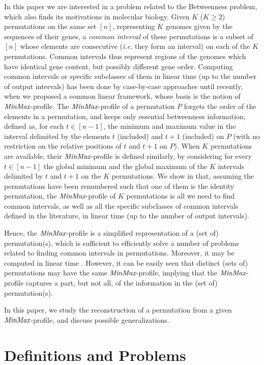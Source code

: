 \documentclass{article}
\newcommand{\M}{\mbox{\it MinMax}}
\newcommand{\n}{[n]}
\begin{document}
In this paper we are interested in a problem related to the {\sc Betweenness} problem,  which also
finds its motivations in molecular biology. Given $K$ ($K\geq 2$) permutations on the
same set $\n$, representing $K$ genomes given by the sequences of their genes, a {\em common interval} 
of these permutations is a subset of $\n$ whose elements are consecutive ({\em i.e.} they form an interval) 
on each of the $K$ permutations. Common intervals thus represent regions of the genomes which have identical 
gene content, but possibly different gene order. Computing common intervals or specific subclasses of
them in linear time (up to the number of output intervals) has been done by case-by-case approaches
until recently, when we  proposed \cite{IR} a common linear framework, whose basis is the notion of
$\M$-profile. The $\M$-profile of a permutation $P$ forgets the order of the elements in a permutation, 
and keeps only essential betweenness information, defined as, for each $t\in [n-1]$, the minimum
and maximum value in the interval delimited by the elements $t$ (included) and $t+1$ (included) 
on $P$ (with no restriction on the relative positions of $t$ and $t+1$ on $P$). When $K$ permutations 
are available, their $\M$-profile is defined similarly, by considering for every  $t\in [n-1]$ the global 
minimum and the global maximum of the $K$ intervals delimited by $t$ and $t+1$ on the $K$ permutations. 
We show in \cite{IR} that, assuming the permutations have been renumbered such that one of them is
the identity permutation, the $\M$-profile of $K$ permutations is all we need to find common intervals,
as well as all the specific subclasses of common intervals defined in the literature, in linear time (up to the number of output intervals).

Hence, the $\M$-profile is a simplified representation of a (set of) permutation(s), which is sufficient
to efficiently solve a number of problems related to finding common intervals in permutations. 
Moreover, it may be computed in linear time \cite{IR}. However, it can be easily seen that distinct
(sets of) permutations may have the same $\M$-profile, implying that the $\M$-profile captures a part,
but not all, of the information in the (set of) permutation(s). 

In this paper, we study the reconstruction of a permutation from a given $\M$-profile, and discuss possible
generalizations.  


\section{Definitions and Problems}\label{sect:def}
\end{document}
